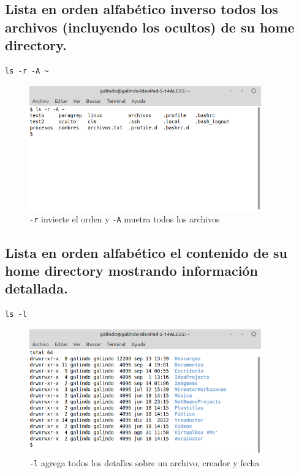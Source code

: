 \documentclass[11pt]{article}
\begin{document}
\cite{AskUbuntu_2017}

\subsection{Lista en orden alfabético inverso todos los archivos (incluyendo los ocultos) de su home directory.}
\label{sec:orgebaee46}
\begin{verbatim}
ls -r -A ~
\end{verbatim}

\begin{figure}[htbp]
\centering
\includegraphics[width=10cm]{img/3.png}
\caption[\texttt{-A}]{\texttt{-r} invierte el orden y \texttt{-A} muetra todos los archivos}
\end{figure}

\pagebreak

\subsection{Lista en orden alfabético el contenido de su home directory mostrando información detallada.}
\label{sec:org2dfd41e}
\begin{verbatim}
ls -l
\end{verbatim}

\begin{figure}[htbp]
\centering
\includegraphics[width=10cm]{img/4.png}
\caption[\texttt{-l}]{\texttt{-l} agrega todos los detalles sobre un archivo, creador y fecha}
\end{figure}
\end{document}
